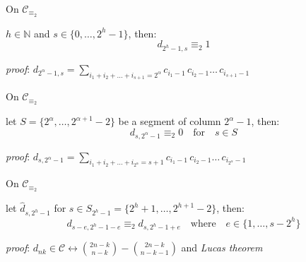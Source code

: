 \documentclass[10pt,serif, professionalfont]{beamer}
\begin{document}
\begin{frame}{On $\mathcal{C}_{\equiv_{2}}$}
    \begin{theorem}
        $h\in\mathbb{N}$ and $s\in\lbrace0,\ldots,2^{h}-1 \rbrace$, then:
        \begin{displaymath}
            d_{2^{h}-1,s} \equiv_{2} 1
        \end{displaymath}
    \end{theorem}
    \emph{proof}: $ d_{2^{\alpha}-1,s} = \sum_{i_{1}+i_{2}+\ldots+i_{s+1}=2^{\alpha}}
                {c_{i_{1}-1}\,c_{i_{2}-1}\ldots\,c_{i_{s+1}-1}}$

    
\end{frame}

\begin{frame}{On $\mathcal{C}_{\equiv_{2}}$}
    \begin{theorem}
        let  $S=\lbrace2^{\alpha},\ldots,2^{\alpha+1}-2\rbrace$ be a segment of 
        column $2^{\alpha}-1$, then:
        \begin{displaymath} 
            d_{s,2^{\alpha}-1}\equiv_{2}0\quad\text{for}\quad s\in S
        \end{displaymath} 
    \end{theorem}
    \emph{proof}: $d_{s, 2^{\alpha}-1} = \sum_{i_{1}+i_{2}+\ldots+i_{2^{\alpha}}=s+1}
            {c_{i_{1}-1}\,c_{i_{2}-1}\ldots\,c_{i_{2^{\alpha}}-1}}$
    
    
        
\end{frame}

\begin{frame}{On $\mathcal{C}_{\equiv_{2}}$}
    \begin{theorem}
    let $\hat{d}_{s,2^{h}-1}$ for $s\in S_{2^{h}-1}=\lbrace 2^{h}+1,\ldots,2^{h+1}-2 \rbrace$, then:
    \begin{displaymath}
        d_{s-e,2^{h}-1-e} \equiv_{2} d_{s,2^{h}-1+e}\quad\text{where}\quad
            e\in\lbrace1,\ldots,s-2^{h}\rbrace
    \end{displaymath}
    \end{theorem}
    \emph{proof}: $ d_{nk}\in\mathcal{C}\leftrightarrow{{2n-k}\choose{n-k}} - {{2n-k}\choose{n-k-1}}$ and \emph{Lucas theorem}

    
        
\end{frame}
\end{document}
